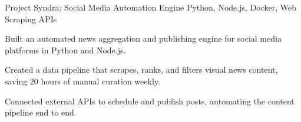 \resumeSubheading
  {Project Syndra: Social Media Automation Engine}{}
  {Python, Node.js, Docker, Web Scraping APIs}{}
  \resumeItemListStart
    \item \small{Built an automated news aggregation and publishing engine for social media platforms in Python and Node.js.}
    \item \small{Created a data pipeline that scrapes, ranks, and filters visual news content, saving 20 hours of manual curation weekly.}
    \item \small{Connected external APIs to schedule and publish posts, automating the content pipeline end to end.}
  \resumeItemListEnd
